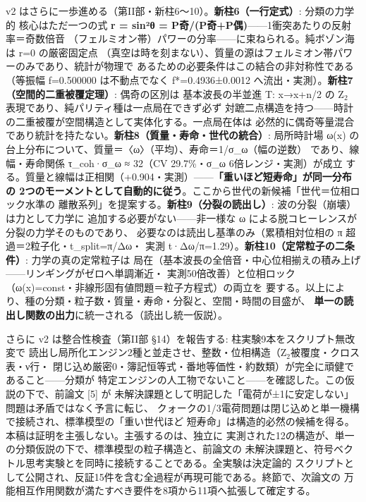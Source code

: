 \documentclass[
]{ltjarticle}
\begin{document}
v2 はさらに一歩進める（第II部・新柱6〜10）。\textbf{新柱6（一行定式）}:
分類の力学的 核心はただ一つの式 \textbf{r = sin²θ =
P奇/(P奇+P偶)}------1衝突あたりの反射率＝奇数倍音
（フェルミオン帯）パワーの分率------に束ねられる。純ボゾン海は r=0
の厳密固定点
（真空は時を刻まない）、質量の源はフェルミオン帯パワーのみであり、統計が物理で
あるための必要条件はこの結合の非対称性である（等振幅 f=0.500000
は不動点でなく f*=0.4936±0.0012
へ流出・実測）。\textbf{新柱7（空間的二重被覆定理）}: 偶奇の区別は
基本波長の半並進 T: x→x+n/2 の Z\(_{2}\)
表現であり、純パリティ種は一点局在できず必ず
対蹠二点構造を持つ------時計の二重被覆が空間構造として実体化する。一点局在体は
必然的に偶奇等量混合であり統計を持たない。\textbf{新柱8（質量・寿命・世代の統合）}:
局所時計場 ω(x)
の台上分布について、質量＝〈ω〉（平均）、寿命＝1/σ\_ω（幅の逆数）
であり、線幅・寿命関係 τ\_coh·σ\_ω ≈ 32（CV 29.7\%・σ\_ω
6倍レンジ・実測）が成立
する。質量と線幅は正相関（+0.904・実測）------\textbf{「重いほど短寿命」が同一分布の
2つのモーメントとして自動的に従う}。ここから世代の新候補「世代＝位相ロック水準の
離散系列」を提案する。\textbf{新柱9（分裂の読出し）}:
波の分裂（崩壊）は力として力学に 追加する必要がない------非一様な ω
による脱コヒーレンスが分裂の力学そのものであり、
必要なのは読出し基準のみ（累積相対位相の π
超過＝2粒子化・t\_split=π/Δω・ 実測
t·Δω/π=1.29）。\textbf{新柱10（定常粒子の二条件）}: 力学の真の定常粒子は
局在（基本波長の全倍音・中心位相揃えの積み上げ------リンギングがゼロへ単調漸近・
実測50倍改善）と位相ロック（ω(x)=const・非線形固有値問題＝粒子方程式）の両立を
要する。以上により、種の分類・粒子数・質量・寿命・分裂と、空間・時間の目盛が、
\textbf{単一の読出し関数の出力}に統一される（読出し統一仮説）。

さらに v2 は整合性検査（第II部 §14）を報告する:
柱実験9本をスクリプト無改変で
読出し局所化エンジン2種と並走させ、整数・位相構造（Z\(_{2}\)被覆度・クロス表・ν行・
閉じ込め厳密0・簿記恒等式・番地等価性・約数類）が完全に頑健であること------分類が
特定エンジンの人工物でないこと------を確認した。この仮説の下で、前論文
{[}5{]} が
未解決課題として明記した「電荷が±1に安定しない」問題は矛盾ではなく予言に転じ、
クォークの1/3電荷問題は閉じ込めと単一機構で接続され、標準模型の「重い世代ほど
短寿命」は構造的必然の候補を得る。本稿は証明を主張しない。主張するのは、独立に
実測された12の構造が、単一の分類仮説の下で、標準模型の粒子構造と、前論文の
未解決課題と、符号ベクトル思考実験とを同時に接続することである。全実験は決定論的
スクリプトとして公開され、反証15件を含む全過程が再現可能である。終節で、次論文の
万能相互作用関数が満たすべき要件を8項から11項へ拡張して確定する。
\end{document}
